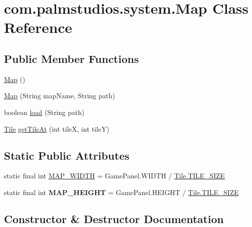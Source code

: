 \hypertarget{classcom_1_1palmstudios_1_1system_1_1_map}{}\section{com.\+palmstudios.\+system.\+Map Class Reference}
\label{classcom_1_1palmstudios_1_1system_1_1_map}
\subsection*{Public Member Functions}
\begin{DoxyCompactItemize}
\item 
\hyperlink{classcom_1_1palmstudios_1_1system_1_1_map_ae3f95f18a90945b6f462b2eaf67b70e3}{Map} ()
\item 
\hyperlink{classcom_1_1palmstudios_1_1system_1_1_map_a16c4039962cbe6283611c7ec1eecae8c}{Map} (String map\+Name, String path)
\item 
boolean \hyperlink{classcom_1_1palmstudios_1_1system_1_1_map_a8ce10a04520ed4c9c61e9548226155d2}{load} (String path)
\item 
\hyperlink{classcom_1_1palmstudios_1_1system_1_1_tile}{Tile} \hyperlink{classcom_1_1palmstudios_1_1system_1_1_map_af424032f2ca95cea0101500487218c72}{get\+Tile\+At} (int tileX, int tileY)
\end{DoxyCompactItemize}
\subsection*{Static Public Attributes}
\begin{DoxyCompactItemize}
\item 
static final int \hyperlink{classcom_1_1palmstudios_1_1system_1_1_map_a562dc563813042f35ae93f7b8709b6a3}{M\+A\+P\+\_\+\+W\+I\+D\+TH} = Game\+Panel.\+W\+I\+D\+TH / \hyperlink{classcom_1_1palmstudios_1_1system_1_1_tile_aae4ab12b21c96fe4796978dc3ba6f8dc}{Tile.\+T\+I\+L\+E\+\_\+\+S\+I\+ZE}
\item 
\mbox{\label{classcom_1_1palmstudios_1_1system_1_1_map_adfc532cbbedae13f0057ac4a066f30b3}} 
static final int {\bfseries M\+A\+P\+\_\+\+H\+E\+I\+G\+HT} = Game\+Panel.\+H\+E\+I\+G\+HT / \hyperlink{classcom_1_1palmstudios_1_1system_1_1_tile_aae4ab12b21c96fe4796978dc3ba6f8dc}{Tile.\+T\+I\+L\+E\+\_\+\+S\+I\+ZE}
\end{DoxyCompactItemize}


\subsection{Constructor \& Destructor Documentation}
\mbox{\label{classcom_1_1palmstudios_1_1system_1_1_map_ae3f95f18a90945b6f462b2eaf67b70e3}} 
